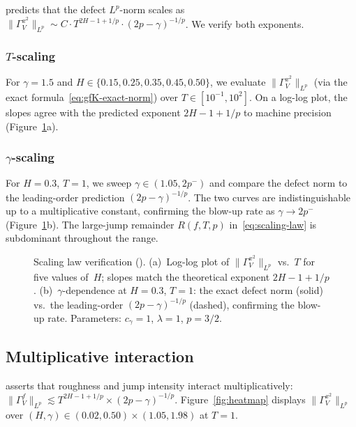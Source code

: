 \documentclass[11pt,a4paper]{article}
\theoremstyle{plain}
\theoremstyle{definition}
\theoremstyle{remark}
\begin{document}
 predicts that the defect $L^p$-norm
scales as
$\|\Gamma_V^{x^2}\|_{L^p} \sim C \cdot T^{2H - 1 + 1/p}
\cdot (2p - \gamma)^{-1/p}$.
We verify both exponents.

\subsubsection{$T$-scaling}

For $\gamma = 1.5$ and $H \in \{0.15, 0.25, 0.35, 0.45, 0.50\}$,
we evaluate $\|\Gamma_V^{x^2}\|_{L^p}$ (via the exact
formula~\eqref{eq:gfK-exact-norm}) over
$T \in [10^{-1}, 10^2]$.  On a log-log plot, the slopes
agree with the predicted exponent $2H - 1 + 1/p$ to
machine precision (Figure~\ref{fig:scaling}a).

\subsubsection{$\gamma$-scaling}

For $H = 0.3$, $T = 1$, we sweep $\gamma \in (1.05, 2p^-)$
and compare the defect norm to the leading-order
prediction $(2p - \gamma)^{-1/p}$.
The two curves are indistinguishable up to a
multiplicative constant, confirming the blow-up rate as
$\gamma \to 2p^-$ (Figure~\ref{fig:scaling}b).
The large-jump remainder $R(f,T,p)$
in~\eqref{eq:scaling-law} is subdominant throughout the
range.

\begin{figure}[ht]
\centering
\caption{Scaling law verification ().
(a)~Log-log plot of $\|\Gamma_V^{x^2}\|_{L^p}$ vs.\ $T$
for five values of~$H$; slopes match the theoretical
exponent $2H - 1 + 1/p$.
(b)~$\gamma$-dependence at $H = 0.3$, $T = 1$: the
exact defect norm (solid) vs.\ the leading-order
$(2p - \gamma)^{-1/p}$ (dashed), confirming the
blow-up rate.  Parameters: $c_\gamma = 1$,
$\lambda = 1$, $p = 3/2$.}
\label{fig:scaling}
\end{figure}


\subsection{Multiplicative interaction}

 asserts that roughness and jump
intensity interact multiplicatively:
$\|\Gamma_V^f\|_{L^p} \lesssim
T^{2H - 1 + 1/p} \times (2p - \gamma)^{-1/p}$.
Figure~\ref{fig:heatmap} displays
$\|\Gamma_V^{x^2}\|_{L^p}$ over
$(H, \gamma) \in (0.02, 0.50) \times (1.05, 1.98)$
at $T = 1$.
\end{document}
